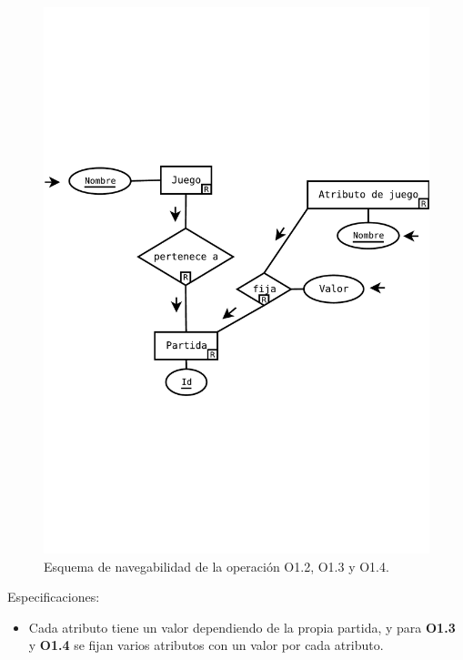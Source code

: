 \begin{figure}[h!]
	\centering
	\includegraphics[width=0.7\linewidth]{../Diagramas/pdf/Op2-Consulta.pdf}
	\caption{Esquema de navegabilidad de la operación O1.2, O1.3 y O1.4.}
	
	\label{fig:O1.2}
\end{figure}

Especificaciones:
\begin{itemize}
	\item Cada atributo tiene un valor dependiendo de la propia partida, y para \textbf{O1.3} y \textbf{O1.4} se fijan varios atributos con un valor por cada atributo.
\end{itemize}
